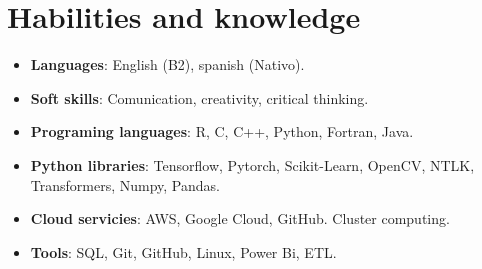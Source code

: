 \documentclass[a3paper]{adcv_color}
\begin{document}
\begin{minipage}{0.62\linewidth}
	\section{Habilities and knowledge}
	\begin{itemize}
		\setlength\itemsep{0em}
		\item \textbf{Languages}: English (B2), spanish (Nativo).
		\item \textbf{Soft skills}:
			Comunication, creativity, critical thinking.
		\item \textbf{Programing languages}:
		      R, C, C++, Python, Fortran, Java.
		\item \textbf{Python libraries}:
		      Tensorflow, Pytorch, Scikit-Learn, OpenCV, NTLK, Transformers, Numpy, Pandas.
		\item \textbf{Cloud servicies}:
		      AWS, Google Cloud, GitHub. Cluster computing.
		\item \textbf{Tools}:
		      SQL, Git, GitHub, Linux, Power Bi, ETL.
	\end{itemize}
\end{minipage}
\end{document}
